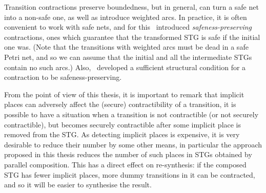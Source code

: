 Transition contractions preserve boundedness, but in general,
can turn a safe net into a non-safe one, as well as
introduce weighted arcs. In practice, it is often convenient to work with safe nets, and for this~\cite{KSVW-09} introduced \emph{safeness-preserving} contractions, \ie ones which
guarantee that  the transformed STG is safe if the initial one
was. (Note that the transitions with weighted arcs must be dead
in a safe Petri net, and so we can assume that the initial and
all the intermediate STGs contain no such arcs.) Also,~\cite{KSVW-09} developed a sufficient structural
condition for a contraction to be safe\-ness-pre\-ser\-ving.

From the point of view of this thesis, it is important to remark that implicit places can adversely affect the (secure) contractibility of a transition, \ie it is possible to have a situation when a transition is not contractible (or not securely contractible), but becomes securely contractible after some implicit place is removed from the STG. As detecting implicit places is expensive, it is very desirable to reduce their number by some other means, in particular the approach proposed in this thesis reduces the number of such places in STGs obtained by parallel composition. This has a direct effect on re-synthesis: if the composed STG has fewer implicit places, more dummy transitions in it can be contracted, and so it will be easier to synthesise the result.

